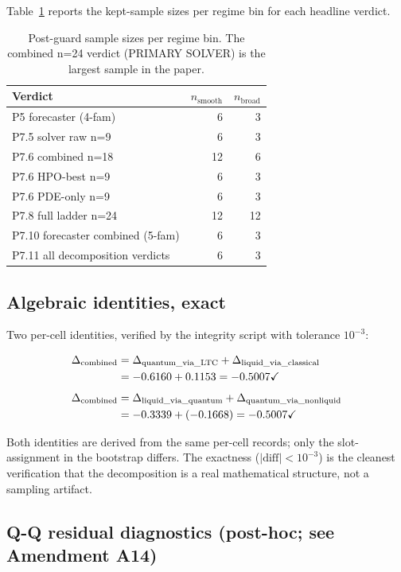 \documentclass[%
  prx,
  amsmath,
  amssymb,
  aps,
  reprint,
  superscriptaddress,
  floatfix,
]{revtex4-2}
\begin{document}
Table~\ref{sup:tab:bins} reports the kept-sample sizes per regime
bin for each headline verdict.

\begin{table}[h]
\centering
\caption{Post-guard sample sizes per regime bin. The combined
n=24 verdict (PRIMARY SOLVER) is the largest sample in the paper.}
\label{sup:tab:bins}
\small
\begin{tabular}{lrr}
\toprule
Verdict & $n_\mathrm{smooth}$ & $n_\mathrm{broad}$ \\
\midrule
P5 forecaster (4-fam) & 6 & 3 \\
P7.5 solver raw n=9 & 6 & 3 \\
P7.6 combined n=18 & 12 & 6 \\
P7.6 HPO-best n=9 & 6 & 3 \\
P7.6 PDE-only n=9 & 6 & 3 \\
P7.8 full ladder n=24 & 12 & 12 \\
P7.10 forecaster combined (5-fam) & 6 & 3 \\
P7.11 all decomposition verdicts & 6 & 3 \\
\bottomrule
\end{tabular}
\end{table}

\subsection{Algebraic identities, exact}

Two per-cell identities, verified by the integrity script with
tolerance $10^{-3}$:

\begin{align}
\Delta_\mathrm{combined}
  &= \Delta_\mathrm{quantum\_via\_LTC} + \Delta_\mathrm{liquid\_via\_classical}
  \notag \\
  &= -0.6160 + 0.1153 = -0.5007 \checkmark \\[4pt]
\Delta_\mathrm{combined}
  &= \Delta_\mathrm{liquid\_via\_quantum} + \Delta_\mathrm{quantum\_via\_nonliquid}
  \notag \\
  &= -0.3339 + (-0.1668) = -0.5007 \checkmark
\end{align}

Both identities are derived from the same per-cell records; only
the slot-assignment in the bootstrap differs. The exactness
($|\text{diff}| < 10^{-3}$) is the cleanest verification that the
decomposition is a real mathematical structure, not a sampling
artifact.

\subsection{Q-Q residual diagnostics (post-hoc; see Amendment A14)}
\label{sup:qq-diagnostics}
\end{document}
